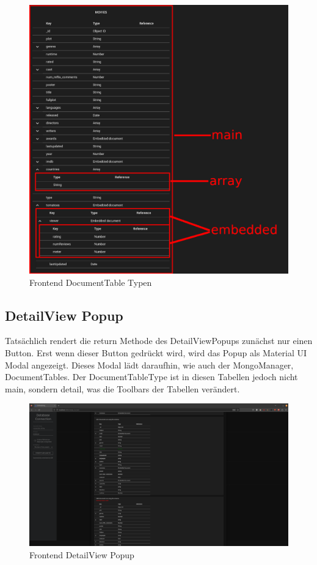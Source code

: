 \begin{figure}[H]
    \includegraphics[width=360pt]{images/table_types}
    \caption{Frontend DocumentTable Typen}
    \label{fig:table_types}
\end{figure}

\subsection{DetailView Popup}
\label{sub:fe_detail_view}

Tatsächlich rendert die return Methode des DetailViewPopups zunächst nur einen Button. 
Erst wenn dieser Button gedrückt wird, wird das Popup als Material UI Modal angezeigt.
Dieses Modal lädt daraufhin, wie auch der MongoManager, DocumentTables.
Der DocumentTableType ist in diesen Tabellen jedoch nicht main, sondern detail, was die Toolbars der Tabellen verändert.


\begin{figure}[H]
    \includegraphics[width=\textwidth]{images/frontend_detail_view}
    \caption{Frontend DetailView Popup}
    \label{fig:frontend_detail_view}
\end{figure}

